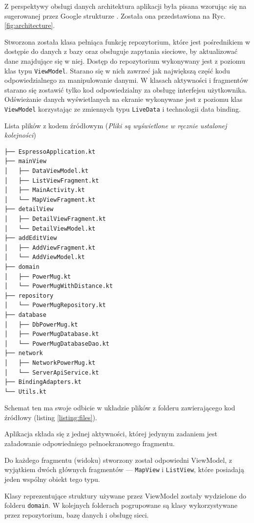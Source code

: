 \documentclass[polish,polish,a4paper,12pt]{article}
\begin{document}
		Z perspektywy obsługi danych architektura aplikacji była pisana wzorując się na sugerowanej przez Google strukturze \cite{googlearch}\cite{kotlin}. Została ona przedstawiona na Ryc. \ref{fig:architecture}.

		Stworzona została klasa pełniąca funkcję repozytorium, które jest pośrednikiem w dostępie do danych z bazy oraz obsługuje zapytania sieciowe, by aktualizować dane znajdujące się w niej. Dostęp do repozytorium wykonywany jest z poziomu klas typu \texttt{ViewModel}. Starano się w nich zawrzeć jak największą część kodu odpowiedzialnego za manipulowanie danymi. W klasach aktywności i fragmentów starano się zostawić tylko kod odpowiedzialny za obsługę interfejsu użytkownika. Odświeżanie danych wyświetlanych na ekranie wykonywane jest z poziomu klas \texttt{ViewModel} korzystając ze zmiennych typu \texttt{LiveData} i technologii data binding.

		\begin{listing}[H]
			\caption{Lista plików z kodem źródłowym (\textit{Pliki są wyświetlone w ręcznie ustalonej kolejności})}
			\begin{verbatim}
├── EspressoApplication.kt
├── mainView
│   ├── DataViewModel.kt
│   ├── ListViewFragment.kt
│   ├── MainActivity.kt
│   └── MapViewFragment.kt
├── detailView
│   ├── DetailViewFragment.kt
│   └── DetailViewModel.kt
├── addEditView
│   ├── AddViewFragment.kt
│   └── AddViewModel.kt
├── domain
│   ├── PowerMug.kt
│   └── PowerMugWithDistance.kt
├── repository
│   └── PowerMugRepository.kt
├── database
│   ├── DbPowerMug.kt
│   ├── PowerMugDatabase.kt
│   └── PowerMugDatabaseDao.kt
├── network
│   ├── NetworkPowerMug.kt
│   └── ServerApiService.kt
├── BindingAdapters.kt
└── Utils.kt
			\end{verbatim}
			\label{listing:files}
		\end{listing}

		Schemat ten ma swoje odbicie w układzie plików z folderu zawierającego kod źródłowy (listing \ref{listing:files}).

		Aplikacja składa się z jednej aktywności, której jedynym zadaniem jest załadowanie odpowiedniego pełnoekranowego fragmentu.

		Do każdego fragmentu (widoku) stworzony został odpowiedni ViewModel, z wyjątkiem dwóch głównych fragmentów — \texttt{MapView} i \texttt{ListView}, które posiadają jeden wspólny obiekt tego typu.

		Klasy reprezentujące struktury używane przez ViewModel zostały wydzielone do folderu \texttt{domain}. W kolejnych folderach pogrupowane są klasy wykorzystywane przez repozytorium, bazę danych i obsługę sieci.
\end{document}
